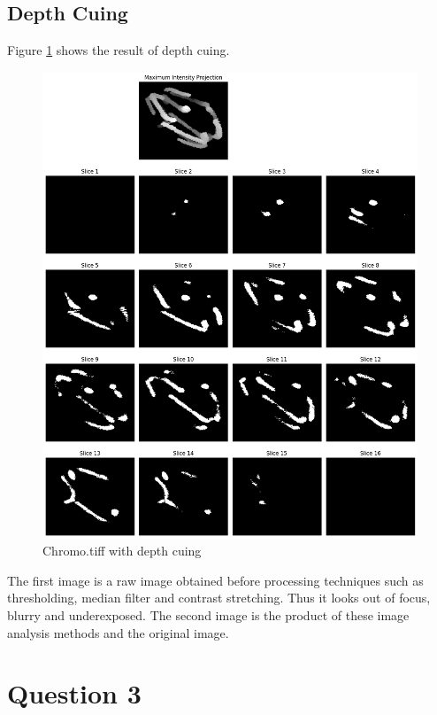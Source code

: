 \documentclass{article}
\begin{document}
\subsection*{Depth Cuing}
Figure \ref{fig:depth-cuing-results} shows the result of depth cuing. 
\begin{figure}[h!]
    \centering
    \includegraphics[width=1\linewidth]{Report/Images/mip.png}
    \caption{Chromo.tiff with depth cuing}
    \label{fig:depth-cuing-results}
\end{figure}

The first image is a raw image obtained before processing techniques such as thresholding, median filter and contrast stretching. Thus it looks out of focus, blurry and underexposed. The second image is the product of these image analysis methods and the original image. 



\clearpage
\section*{Question 3}
\end{document}
